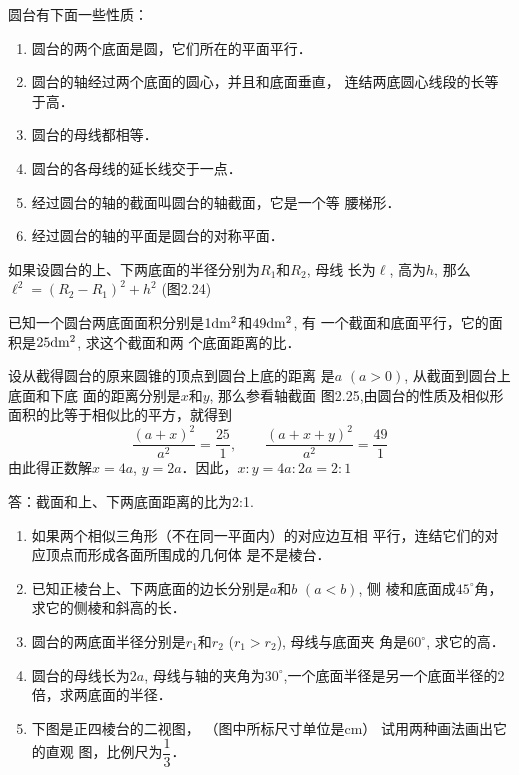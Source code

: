 圆台有下面一些性质：
\begin{enumerate}
\item 圆台的两个底面是圆，它们所在的平面平行．
\item 圆台的轴经过两个底面的圆心，并且和底面垂直，
连结两底圆心线段的长等于高．
\item 圆台的母线都相等．
\item 圆台的各母线的延长线交于一点．
\item 经过圆台的轴的截面叫圆台的轴截面，它是一个等
腰梯形．
\item 经过圆台的轴的平面是圆台的对称平面．
\end{enumerate}

如果设圆台的上、下两底面的半径分别为$R_1$和$R_2$, 母线
长为$\ell$, 高为$h$, 那么$\ell^2=(R_2-R_1)^2+h^2$ (图2.24)

\begin{example}
    已知一个圆台两底面面积分别是$1{\rm dm^2}$和$49{\rm dm^2}$, 有
    一个截面和底面平行，它的面积是$25{\rm dm^2}$, 求这个截面和两
    个底面距离的比．
\end{example}

\begin{figure}[htp]
    \centering
{}
    \caption{}
\end{figure}

\begin{solution}
    设从截得圆台的原来圆锥的顶点到圆台上底的距离
是$a$ $(a>0)$, 从截面到圆台上底面和下底
面的距离分别是$x$和$y$, 那么参看轴截面
图2.25,由圆台的性质及相似形面积的比等于相似比的平方，就得到
\[\frac{(a+x)^2}{a^2}=\frac{25}{1},\qquad \frac{(a+x+y)^2}{a^2}=\frac{49}{1}\]
由此得正数解$x=4a$, $y=2a$．因此，$x:y=4a:2a=2:1$

答：截面和上、下两底面距离的比为2:1.
\end{solution}



\begin{ex}
\begin{enumerate}
    \item 如果两个相似三角形（不在同一平面内）的对应边互相
    平行，连结它们的对应顶点而形成各面所围成的几何体
    是不是棱台．
    \item 已知正棱台上、下两底面的边长分别是$a$和$b$ $(a<b)$, 侧
    棱和底面成$45^{\circ}$角，求它的侧棱和斜高的长．
    \item 圆台的两底面半径分别是$r_1$和$r_2$ ($r_1>r_2$), 母线与底面夹
    角是$60^{\circ}$, 求它的高．
    \item 圆台的母线长为$2a$, 母线与轴的夹角为$30^{\circ}$,一个底面半径是另一个底面半径的2倍，求两底面的半径．
    \item 下图是正四棱台的二视图，
    （图中所标尺寸单位是cm）
    试用两种画法画出它的直观
    图，比例尺为$\dfrac{1}{3}$．
\end{enumerate}
\end{ex}

